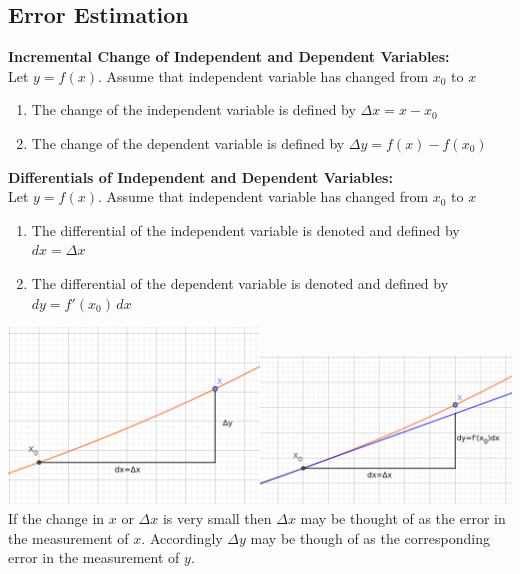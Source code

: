 \documentclass[14pt]{article}
\begin{document}
    \subsection{Error Estimation} 
    \textbf{Incremental Change of Independent and Dependent Variables:}\\
    Let $y=f(x)$. Assume that independent variable has changed from $x_0$ to $x$
    \begin{enumerate}
        \item The change of the independent variable is defined by $\Delta x=x-x_0$
        \item The change of the dependent variable is defined by $\Delta y=f(x)-f(x_0)$
    \end{enumerate}
    \textbf{Differentials of Independent and Dependent Variables:}\\
    Let $y=f(x)$. Assume that independent variable has changed from $x_0$ to $x$
    \begin{enumerate}
        \item The differential of the independent variable is denoted and defined by $dx=\Delta x$
        \item The differential of the dependent variable is denoted and defined by $dy=f'(x_0)\, dx$
    \end{enumerate}
    \includegraphics[width=0.5\textwidth]{differentials.png}\includegraphics[width=0.5\textwidth]{differentials2.png}\\
    If the change in $x$ or $\Delta x$ is very small then $\Delta x$ may be thought of as the error in the measurement of $x$. Accordingly $\Delta y$ may be though of as the corresponding error in the measurement of $y$.\\
\end{document}
